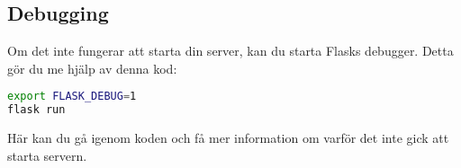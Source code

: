 \documentclass{TDP003mall}
\begin{document}
\subsection{Debugging}
Om det inte fungerar att starta din server, kan du starta Flasks debugger. Detta gör du me hjälp av denna kod:
\begin{lstlisting}[language=bash]
export FLASK_DEBUG=1
flask run
\end{lstlisting}
Här kan du gå igenom koden och få mer information om varför det inte gick att starta servern.
\end{document}
